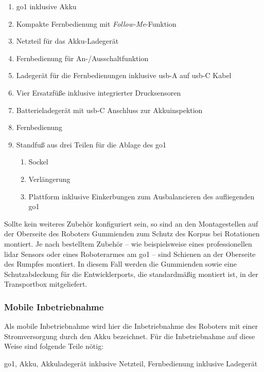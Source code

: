 \begin{enumerate}
    \item \gls{go1} inklusive Akku
    \item Kompakte Fernbedienung mit \emph{Follow-Me}-Funktion
    \item Netzteil für das Akku-Ladegerät
    \item Fernbedienung für An-/Ausschaltfunktion
    \item Ladegerät für die Fernbedienungen inklusive \gls{usb}-A auf \gls{usb}-C Kabel
    \item Vier Ersatzfüße inklusive integrierter Drucksensoren
    \item Batterieladegerät mit \gls{usb}-C Anschluss zur Akkuinspektion
    \item Fernbedienung
    \item Standfuß aus drei Teilen für die Ablage des \gls{go1}
    \begin{enumerate}
        \item Sockel
        \item Verlängerung
        \item Plattform inklusive Einkerbungen zum Ausbalancieren des aufliegenden \gls{go1}
    \end{enumerate}
\end{enumerate}

Sollte kein weiteres Zubehör konfiguriert sein, so sind an den Montagestellen auf der Oberseite des Roboters Gummienden
zum Schutz des Korpus bei Rotationen montiert.
Je nach bestelltem Zubehör -- wie beispielsweise eines professionellen \gls{lidar} Sensors oder eines
Roboterarmes am \gls{go1} -- sind Schienen an der Oberseite des Rumpfes montiert.
In diesem Fall werden die Gummienden sowie eine Schutzabdeckung für die Entwicklerports, die standardmäßig montiert ist,
in der Transportbox mitgeliefert.

\subsubsection{Mobile Inbetriebnahme}
\label{subsubsec:inbetriebnahme_akku}

Als mobile Inbetriebnahme wird hier die Inbetriebnahme des Roboters mit einer Stromversorgung durch den Akku bezeichnet.
Für die Inbetriebnahme auf diese Weise sind folgende Teile nötig:

\begin{requirements}
    \gls{go1}, Akku, Akkuladegerät inklusive Netzteil, Fernbedienung inklusive Ladegerät
\end{requirements}

